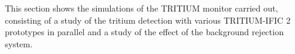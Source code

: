 This section shows the simulations of the TRITIUM monitor carried out, consisting of a study of the tritium detection with various TRITIUM-IFIC 2 prototypes in parallel and a study of the effect of the background rejection system.